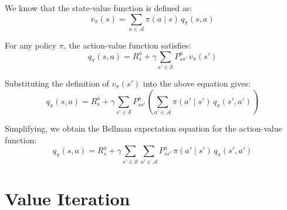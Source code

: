 \documentclass[11pt]{article}
\begin{document}
We know that the state-value function is defined as:
\[
v_{\pi}(s) = \sum_{a \in \mathcal{A}} \pi(a \mid s) \, q_{\pi}(s,a)
\]

For any policy $\pi$, the action-value function satisfies:
\[
q_{\pi}(s,a)
= R_s^a + \gamma \sum_{s' \in \mathcal{S}} P_{ss'}^a \, v_{\pi}(s')
\]

Substituting the definition of $v_{\pi}(s')$ into the above equation gives:
\[
q_{\pi}(s,a)
= R_s^a + \gamma \sum_{s' \in \mathcal{S}} P_{ss'}^a 
   \left( \sum_{a' \in \mathcal{A}} \pi(a' \mid s') \, q_{\pi}(s',a') \right)
\]

Simplifying, we obtain the Bellman expectation equation for the action-value function:
\[
\boxed{
q_{\pi}(s,a)
= R_s^a + \gamma \sum_{s' \in \mathcal{S}} \sum_{a' \in \mathcal{A}} 
      P_{ss'}^a \, \pi(a' \mid s') \, q_{\pi}(s',a')
}
\]

\section{Value Iteration}
\end{document}
